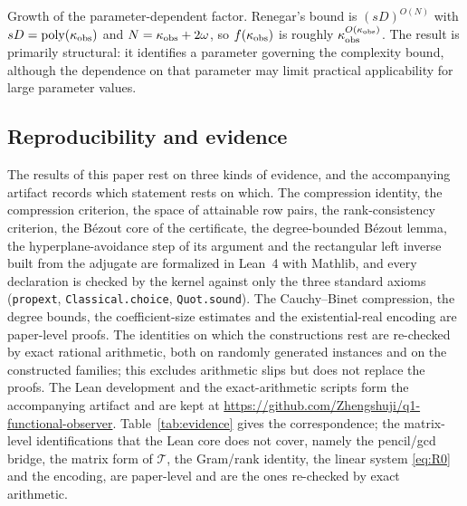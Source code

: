 \documentclass[journal]{IEEEtran}
\theoremstyle{plainn}
\begin{document}
Growth of the parameter-dependent factor. Renegar's bound is $(sD)^{O(N)}$ with $sD=\operatorname{poly}(\kappa_{\rm obs})$ and $N=\kappa_{\rm obs}+2\omega$, so $f(\kappa_{\rm obs})$ is roughly $\kappa_{\rm obs}^{O(\kappa_{\rm obs})}$. The result is primarily structural: it identifies a parameter governing the complexity bound, although the dependence on that parameter may limit practical applicability for large parameter values.

\subsection{Reproducibility and evidence}\label{sec:repro}

The results of this paper rest on three kinds of evidence, and the accompanying artifact records which
statement rests on which. The compression identity, the compression criterion, the space of attainable row
pairs, the rank-consistency criterion, the B\'ezout core of the certificate, the
degree-bounded B\'ezout lemma, the hyperplane-avoidance step of its argument and the
rectangular left inverse built from the adjugate are formalized
in Lean~4 with Mathlib, and every declaration is checked by the kernel against only the three standard axioms
(\texttt{propext}, \texttt{Classical.choice}, \texttt{Quot.sound}). The Cauchy--Binet compression, the
degree bounds, the coefficient-size estimates and the existential-real encoding are paper-level
proofs. The identities on which the constructions rest are re-checked by exact rational arithmetic,
both on randomly generated instances and on the constructed families; this excludes arithmetic slips
but does not replace the proofs. The Lean development and the exact-arithmetic scripts form the
accompanying artifact and are kept at
\url{https://github.com/Zhengshuji/q1-functional-observer}. Table~\ref{tab:evidence} gives the
correspondence; the matrix-level identifications that the Lean core does not cover, namely the
pencil/gcd bridge, the matrix form of $\mathcal T$, the Gram/rank identity, the linear system
\eqref{eq:R0} and the encoding, are paper-level and are the ones re-checked by exact arithmetic.
\end{document}
